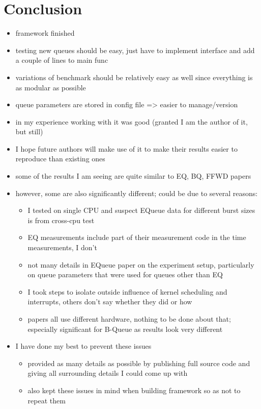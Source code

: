 \section{Conclusion}
\begin{itemize}
    \item framework finished
    \item testing new queues should be easy, just have to implement interface and add a couple of lines to main func
    \item variations of benchmark should be relatively easy as well since everything is as modular as possible
    \item queue parameters are stored in config file => easier to manage/version
    \item in my experience working with it was good (granted I am the author of it, but still)
    \item I hope future authors will make use of it to make their results easier to reproduce than existing ones

    \item some of the results I am seeing are quite similar to EQ, BQ, FFWD papers
    \item however, some are also significantly different; could be due to several reasons:
        \begin{itemize}
            \item I tested on single CPU and suspect EQueue data for different burst sizes is from cross-cpu test
            \item EQ measurements include part of their measurement code in the time measurements, I don't
            \item not many details in EQueue paper on the experiment setup, particularly on queue parameters
                that were used for queues other than EQ
            \item I took steps to isolate outside influence of kernel scheduling and interrupts, others don't say whether they did or how
            \item papers all use different hardware, nothing to be done about that; especially significant for B-Queue as results look very different 
        \end{itemize}
    \item I have done my best to prevent these issues
        \begin{itemize}
            \item provided as many details as possible by publishing full source code and giving all surrounding details I could come up with
            \item also kept these issues in mind when building framework so as not to repeat them
        \end{itemize}


\end{itemize}
